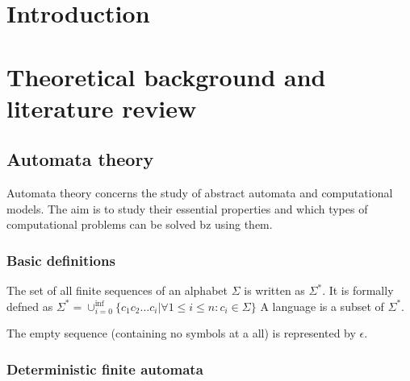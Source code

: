 
\chapter{Introduction}

\chapter{Theoretical background and literature review}

\section{Automata theory}

Automata theory concerns the study of abstract automata and computational models.
The aim is to study their essential properties and which types of computational problems can be solved bz using them.

\subsection{Basic definitions}

\begin{definition}
    The set of all finite sequences of an alphabet $\Sigma$ is written as $\Sigma^\ast$.
    It is formally defned as
        $\Sigma^\ast = \cup_{i=0}^{\inf} \{c_1 c_2 \ldots c_i | \forall 1 \le i \le n: c_i \in \Sigma \} $
    A language is a subset of $\Sigma^\ast$.
\end{definition}

The empty sequence (containing no symbols at a all) is represented by $\epsilon$.

\subsection{Deterministic finite automata}

